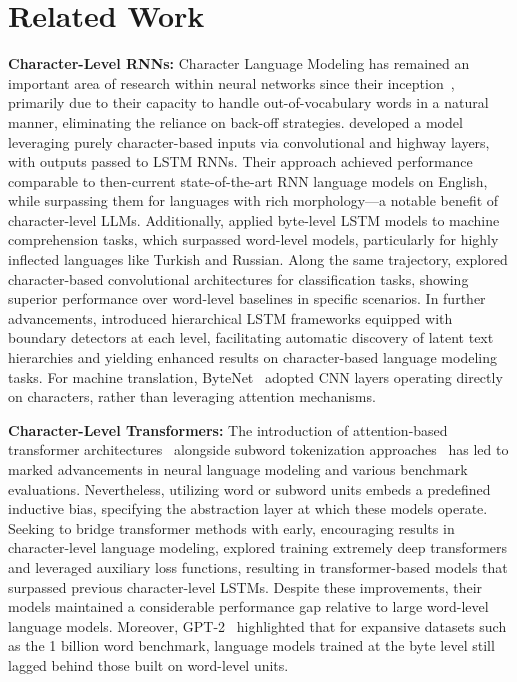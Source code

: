 \section{Related Work}
\label{section:related_work}

\textbf{Character-Level RNNs:} Character Language Modeling has remained an important area of research within neural networks since their inception~\citep{sutskever2011generating,mikolov2012subword,graves2013generating}, primarily due to their capacity to handle out-of-vocabulary words in a natural manner, eliminating the reliance on back-off strategies. \cite{kim2016character} developed a model leveraging purely character-based inputs via convolutional and highway layers, with outputs passed to LSTM RNNs. Their approach achieved performance comparable to then-current state-of-the-art RNN language models on English, while surpassing them for languages with rich morphology—a notable benefit of character-level LLMs. Additionally, \cite{kenter2018byte} applied byte-level LSTM models to machine comprehension tasks, which surpassed word-level models, particularly for highly inflected languages like Turkish and Russian. Along the same trajectory, \cite{zhang2015character} explored character-based convolutional architectures for classification tasks, showing superior performance over word-level baselines in specific scenarios. In further advancements, \citet{chung2019hierarchical} introduced hierarchical LSTM frameworks equipped with boundary detectors at each level, facilitating automatic discovery of latent text hierarchies and yielding enhanced results on character-based language modeling tasks. For machine translation, ByteNet~\cite{kalchbrenner2016neural} adopted CNN layers operating directly on characters, rather than leveraging attention mechanisms.

\textbf{Character-Level Transformers:} The introduction of attention-based transformer architectures~\citep{vaswani2017attention} alongside subword tokenization approaches~\citep{sennrich-etal-2016-neural} has led to marked advancements in neural language modeling and various benchmark evaluations. Nevertheless, utilizing word or subword units embeds a predefined inductive bias, specifying the abstraction layer at which these models operate. Seeking to bridge transformer methods with early, encouraging results in character-level language modeling, \citet{al2019character} explored training extremely deep transformers and leveraged auxiliary loss functions, resulting in transformer-based models that surpassed previous character-level LSTMs. Despite these improvements, their models maintained a considerable performance gap relative to large word-level language models. Moreover, GPT-2~\citep{radfordgpt2} highlighted that for expansive datasets such as the 1 billion word benchmark, language models trained at the byte level still lagged behind those built on word-level units.

